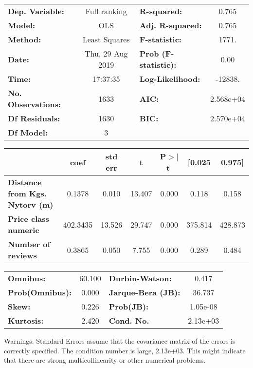 \documentclass{report}
\begin{document}
\begin{center}
\begin{tabular}{lclc}
\toprule
\textbf{Dep. Variable:}                &   Full ranking   & \textbf{  R-squared:         } &     0.765   \\
\textbf{Model:}                        &       OLS        & \textbf{  Adj. R-squared:    } &     0.765   \\
\textbf{Method:}                       &  Least Squares   & \textbf{  F-statistic:       } &     1771.   \\
\textbf{Date:}                         & Thu, 29 Aug 2019 & \textbf{  Prob (F-statistic):} &     0.00    \\
\textbf{Time:}                         &     17:37:35     & \textbf{  Log-Likelihood:    } &   -12838.   \\
\textbf{No. Observations:}             &        1633      & \textbf{  AIC:               } & 2.568e+04   \\
\textbf{Df Residuals:}                 &        1630      & \textbf{  BIC:               } & 2.570e+04   \\
\textbf{Df Model:}                     &           3      & \textbf{                     } &             \\
\bottomrule
\end{tabular}
\begin{tabular}{lcccccc}
                                       & \textbf{coef} & \textbf{std err} & \textbf{t} & \textbf{P$>$$|$t$|$} & \textbf{[0.025} & \textbf{0.975]}  \\
\midrule
\textbf{Distance from Kgs. Nytorv (m)} &       0.1378  &        0.010     &    13.407  &         0.000        &        0.118    &        0.158     \\
\textbf{Price class numeric}           &     402.3435  &       13.526     &    29.747  &         0.000        &      375.814    &      428.873     \\
\textbf{Number of reviews}             &       0.3865  &        0.050     &     7.755  &         0.000        &        0.289    &        0.484     \\
\bottomrule
\end{tabular}
\begin{tabular}{lclc}
\textbf{Omnibus:}       & 60.100 & \textbf{  Durbin-Watson:     } &    0.417  \\
\textbf{Prob(Omnibus):} &  0.000 & \textbf{  Jarque-Bera (JB):  } &   36.737  \\
\textbf{Skew:}          &  0.226 & \textbf{  Prob(JB):          } & 1.05e-08  \\
\textbf{Kurtosis:}      &  2.420 & \textbf{  Cond. No.          } & 2.13e+03  \\
\bottomrule
\end{tabular}
\end{center}

Warnings: \newline
 [1] Standard Errors assume that the covariance matrix of the errors is correctly specified. \newline
 [2] The condition number is large, 2.13e+03. This might indicate that there are \newline
 strong multicollinearity or other numerical problems.
\end{document}
